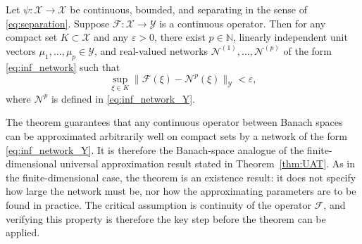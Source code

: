 \begin{theorem}
\label{thm:UAT_inf}
Let $\psi : \mathcal{X} \to \mathcal{X}$ be continuous, bounded, and separating in the sense of \eqref{eq:separation}. Suppose $\mathcal{F} : \mathcal{X} \to \mathcal{Y}$ is a continuous operator. Then for any compact set $K \subset \mathcal{X}$ and any $\varepsilon > 0$, there exist $p \in \mathbb{N}$, linearly independent unit vectors $\mu_1, \ldots, \mu_p \in \mathcal{Y}$, and real-valued networks $\mathcal{N}^{(1)}, \ldots, \mathcal{N}^{(p)}$ of the form \eqref{eq:inf_network} such that
\[
    \sup_{\xi \in K}
    \bigl\|\mathcal{F}(\xi)
    - \mathcal{N}^p(\xi)\bigr\|_{\mathcal{Y}}
    < \varepsilon,
\]
where $\mathcal{N}^p$ is defined in \eqref{eq:inf_network_Y}.
\end{theorem}

The theorem guarantees that any continuous operator between Banach spaces can be approximated arbitrarily well on compact sets by a network of the form \eqref{eq:inf_network_Y}. It is therefore the Banach-space analogue of the finite-dimensional universal approximation result stated in Theorem~\ref{thm:UAT}. As in the finite-dimensional case, the theorem is an existence result: it does not specify how large the network must be, nor how the approximating parameters are to be found in practice. The critical assumption is continuity of the operator $\mathcal{F}$, and verifying this property is therefore the key step before the theorem can be applied.


